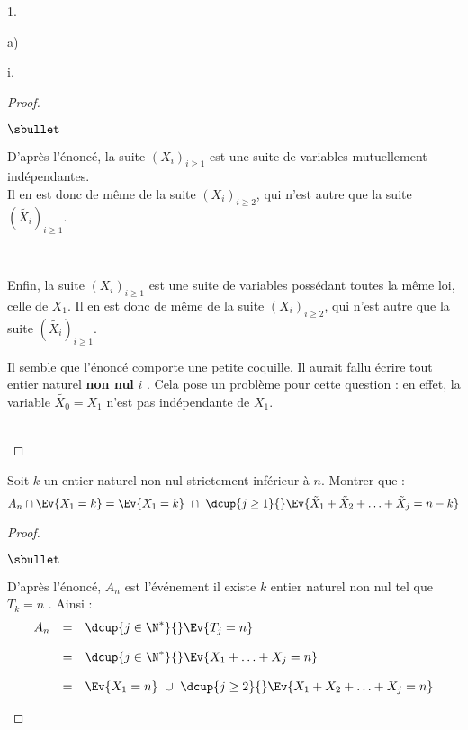 \documentclass[11pt]{article}%
\begin{document}
\begin{noliste}{1.}
\begin{noliste}{a)}
\begin{nonoliste}{i.}
      \begin{proof}~%
        \begin{noliste}{$\sbullet$}
        \item D'après l'énoncé, la suite $(X_i)_{i \geq 1}$ est une
          suite de variables mutuellement indépendantes.\\
          Il en est donc de même de la suite $(X_{i})_{i \geq 2}$, qui
          n'est autre que la suite $(\tilde{X_{i}})_{i \geq 1}$.%

        \item ~\\[-.8cm]

        \item Enfin, la suite $(X_i)_{i \geq 1}$ est une suite de
          variables possédant toutes la même loi, celle de $X_1$. Il
          en est donc de même de la suite $(X_{i})_{i \geq 2}$, qui
          n'est autre que la suite $(\tilde{X_{i}})_{i \geq 1}$.%
        \end{noliste}%
        \begin{remark}%
          Il semble que l'énoncé comporte une petite coquille. Il
          aurait fallu écrire \og tout entier naturel {\bf non nul}
          $i$ \fg{}. Cela pose un problème pour cette question : en
          effet, la variable $\tilde{X_0} = X_1$ n'est pas
          indépendante de $X_1$.
        \end{remark}~\\[-1.2cm]
      \end{proof}

    \item Soit $k$ un entier naturel non nul strictement inférieur à
      $n$. Montrer que :
      \[
      A_n \cap \Ev{X_1=k}=\Ev{X_1=k} \ \cap \ \dcup{j \geq 1}{}
      \Ev{\tilde{X}_1+\tilde{X}_2+ \ldots +\tilde{X}_j=n-k}
      \]

      \begin{proof}~%
        \begin{noliste}{$\sbullet$}
        \item D'après l'énoncé, $A_n$ est l'événement \og il existe
          $k$ entier naturel non nul tel que $T_k = n$ \fg{}. Ainsi :
          \[
          \begin{array}{rcl}
            A_n & = & \dcup{j \in \N^*}{} \Ev{T_j = n}
            \\[.4cm]
            & = & \dcup{j \in \N^*}{} \Ev{X_1 + \ldots + X_j = n}
            \\[.4cm]
            & = & \Ev{X_1 = n} \ \cup \ \dcup{j \geq 2}{} \Ev{X_1 +
              X_2 + \ldots + X_j = n} 
          \end{array}
          \]


\end{noliste}
\end{proof}
\end{nonoliste}
\end{noliste}
\end{noliste}
\end{document}
